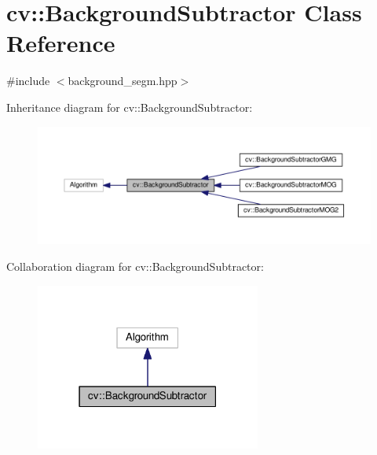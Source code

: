 \hypertarget{classcv_1_1BackgroundSubtractor}{\section{cv\-:\-:Background\-Subtractor Class Reference}
\label{classcv_1_1BackgroundSubtractor}
}


{\ttfamily \#include $<$background\-\_\-segm.\-hpp$>$}



Inheritance diagram for cv\-:\-:Background\-Subtractor\-:\nopagebreak
\begin{figure}[H]
\begin{center}
\leavevmode
\includegraphics[width=350pt]{classcv_1_1BackgroundSubtractor__inherit__graph}
\end{center}
\end{figure}


Collaboration diagram for cv\-:\-:Background\-Subtractor\-:\nopagebreak
\begin{figure}[H]
\begin{center}
\leavevmode
\includegraphics[width=210pt]{classcv_1_1BackgroundSubtractor__coll__graph}
\end{center}
\end{figure}
